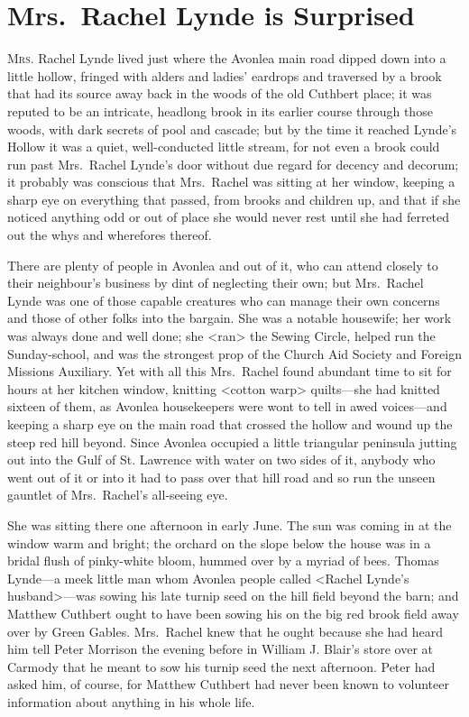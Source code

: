 \chapter{Mrs.~Rachel Lynde is Surprised}

\lettrine[]{M}{rs}. Rachel Lynde lived just where the Avonlea main road dipped down into a little hollow, fringed with alders and ladies' eardrops and traversed by a brook that had its source away back in the woods of the old Cuthbert place; it was reputed to be an intricate, headlong brook in its earlier course through those woods, with dark secrets of pool and cascade; but by the time it reached Lynde's Hollow it was a quiet, well-conducted little stream, for not even a brook could run past Mrs.~Rachel Lynde's door without due regard for decency and decorum; it probably was conscious that Mrs.~Rachel was sitting at her window, keeping a sharp eye on everything that passed, from brooks and children up, and that if she noticed anything odd or out of place she would never rest until she had ferreted out the whys and wherefores thereof.

There are plenty of people in Avonlea and out of it, who can attend closely to their neighbour's business by dint of neglecting their own; but Mrs.~Rachel Lynde was one of those capable creatures who can manage their own concerns and those of other folks into the bargain. She was a notable housewife; her work was always done and well done; she <ran> the Sewing Circle, helped run the Sunday-school, and was the strongest prop of the Church Aid Society and Foreign Missions Auxiliary. Yet with all this Mrs.~Rachel found abundant time to sit for hours at her kitchen window, knitting <cotton warp> quilts—she had knitted sixteen of them, as Avonlea housekeepers were wont to tell in awed voices—and keeping a sharp eye on the main road that crossed the hollow and wound up the steep red hill beyond. Since Avonlea occupied a little triangular peninsula jutting out into the Gulf of St. Lawrence with water on two sides of it, anybody who went out of it or into it had to pass over that hill road and so run the unseen gauntlet of Mrs.~Rachel's all-seeing eye.

She was sitting there one afternoon in early June. The sun was coming in at the window warm and bright; the orchard on the slope below the house was in a bridal flush of pinky-white bloom, hummed over by a myriad of bees. Thomas Lynde—a meek little man whom Avonlea people called <Rachel Lynde's husband>—was sowing his late turnip seed on the hill field beyond the barn; and Matthew Cuthbert ought to have been sowing his on the big red brook field away over by Green Gables. Mrs.~Rachel knew that he ought because she had heard him tell Peter Morrison the evening before in William J\@. Blair's store over at Carmody that he meant to sow his turnip seed the next afternoon. Peter had asked him, of course, for Matthew Cuthbert had never been known to volunteer information about anything in his whole life.

